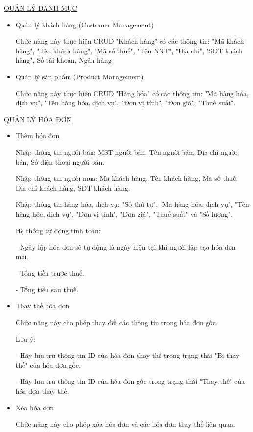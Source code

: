 \item \underline{QUẢN LÝ DANH MỤC}

\begin{itemize}

\item Quản lý khách hàng (Customer Management)

Chức năng này thực hiện CRUD "Khách hàng" có các thông tin: "Mã khách hàng", "Tên khách hàng", "Mã số thuế", "Tên NNT", "Địa chỉ", "SĐT khách hàng", Số tài khoản, Ngân hàng

\item Quản lý sản phẩm (Product Management)

Chức năng này thực hiện CRUD "Hàng hóa" có các thông tin: "Mã hàng hóa, dịch vụ", "Tên hàng hóa, dịch vụ", "Đơn vị tính", "Đơn giá", "Thuế suất".

\end{itemize}

\item \underline{QUẢN LÝ HÓA ĐƠN}

\begin{itemize}

\item Thêm hóa đơn

Nhập thông tin người bán: MST người bán, Tên người bán, Địa chỉ người bán, Số điện thoại người bán.

Nhập thông tin người mua: Mã khách hàng, Tên khách hàng, Mã số thuế, Địa chỉ khách hàng, SĐT khách hàng.

Nhập thông tin hàng hóa, dịch vụ: "Số thứ tự", "Mã hàng hóa, dịch vụ", "Tên hàng hóa, dịch vụ", "Đơn vị tính", "Đơn giá", "Thuế suất" và "Số lượng".

Hệ thống tự động tính toán:

- Ngày lập hóa đơn sẽ tự động là ngày hiện tại khi người lập tạo hóa đơn mới.

- Tổng tiền trước thuế.

- Tổng tiền sau thuế.

\item Thay thế hóa đơn

Chức năng này cho phép thay đổi các thông tin trong hóa đơn gốc.

Lưu ý:

- Hãy lưu trữ thông tin ID của hóa đơn thay thế trong trạng thái "Bị thay thế" của hóa đơn gốc.

- Hãy lưu trữ thông tin ID của hóa đơn gốc trong trạng thái "Thay thế" của hóa đơn thay thế.

\item Xóa hóa đơn

Chức năng này cho phép xóa hóa đơn và các hóa đơn thay thế liên quan.

\end{itemize}

